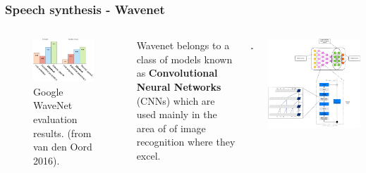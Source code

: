 \documentclass[a4paper,9pt]{beamer}
\theoremstyle{mytheoremstyle}
\begin{document}
\begin{frame}
\frametitle{Speech synthesis - Wavenet}
\begin{columns}
\begin{figure}
\begin{center}
  \includegraphics[width=\textwidth]{res/wavenet_evaluation.png}
\end{center}
	\caption{Google WaveNet evaluation results. (from van den Oord 2016).}
\end{figure}
\begin{exampleblock}{}
\scriptsize{
Wavenet belongs to a class of models known as
\textbf{Convolutional Neural Networks} (CNNs)
which are used mainly in the area of of image recognition where they excel.}
\end{exampleblock}
\begin{center}
  \includegraphics[width=0.5cm]{res/speaker_icon.png}
\end{center}
\includegraphics[width=\textwidth]{res/tcn.png}

\end{columns}
\end{frame}
\end{document}

